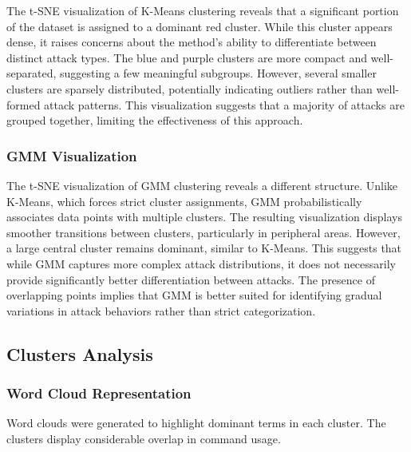         The t-SNE visualization of K-Means clustering reveals that a significant portion of the dataset is assigned to a dominant red cluster. While this cluster appears dense, it raises concerns about the method’s ability to differentiate between distinct attack types. The blue and purple clusters are more compact and well-separated, suggesting a few meaningful subgroups. However, several smaller clusters are sparsely distributed, potentially indicating outliers rather than well-formed attack patterns. This visualization suggests that a majority of attacks are grouped together, limiting the effectiveness of this approach.

        \subsubsection{GMM Visualization \\}
        
        The t-SNE visualization of GMM clustering reveals a different structure. Unlike K-Means, which forces strict cluster assignments, GMM probabilistically associates data points with multiple clusters. The resulting visualization displays smoother transitions between clusters, particularly in peripheral areas. However, a large central cluster remains dominant, similar to K-Means. This suggests that while GMM captures more complex attack distributions, it does not necessarily provide significantly better differentiation between attacks. The presence of overlapping points implies that GMM is better suited for identifying gradual variations in attack behaviors rather than strict categorization.

    \subsection{Clusters Analysis}

        \subsubsection{Word Cloud Representation \\}

            Word clouds were generated to highlight dominant terms in each cluster. The clusters display considerable overlap in command usage.

